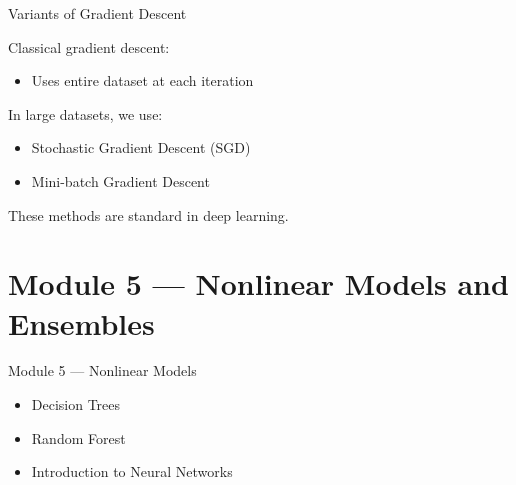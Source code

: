 \documentclass{beamer}
\begin{document}
\begin{frame}{Variants of Gradient Descent}

Classical gradient descent:

\begin{itemize}
    \item Uses entire dataset at each iteration
\end{itemize}

\vspace{0.5cm}

In large datasets, we use:

\begin{itemize}
    \item Stochastic Gradient Descent (SGD)
    \item Mini-batch Gradient Descent
\end{itemize}

\vspace{0.5cm}

These methods are standard in deep learning.

\end{frame}

\section{Module 5 — Nonlinear Models and Ensembles}

\begin{frame}{Module 5 — Nonlinear Models}
\begin{itemize}
    \item Decision Trees
    \item Random Forest
    \item Introduction to Neural Networks
\end{itemize}
\end{frame}
\end{document}
